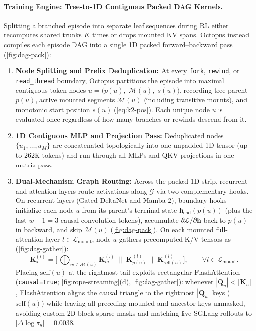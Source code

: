 \documentclass{article}
\begin{document}
\paragraph{Training Engine: Tree-to-1D Contiguous Packed DAG Kernels.}
Splitting a branched episode into separate leaf sequences during RL either recomputes shared trunks $K$ times or drops mounted KV spans. Octopus instead compiles each episode DAG into a single 1D packed forward--backward pass (\cref{fig:dag-pack}):
\begin{enumerate}[leftmargin=15pt, itemsep=1.5pt, topsep=2pt]
  \item \textbf{Node Splitting and Prefix Deduplication:} At every \texttt{fork}, \texttt{rewind}, or \texttt{read\_thread} boundary, Octopus partitions the episode into maximal contiguous token nodes $u = \big(p(u),\; \mathcal{M}(u),\; s(u)\big)$, recording tree parent $p(u)$, active mounted segments $\mathcal{M}(u)$ (including transitive mounts), and monotonic start position $s(u)$ (\cref{eq:k2-pos}). Each unique node $u$ is evaluated once regardless of how many branches or rewinds descend from it.
  \item \textbf{1D Contiguous MLP and Projection Pass:} Deduplicated nodes $\{u_1, \dots, u_M\}$ are concatenated topologically into one unpadded 1D tensor (up to $262\text{K}$ tokens) and run through all MLPs and QKV projections in one matrix pass.
  \item \textbf{Dual-Mechanism Graph Routing:} Across the packed 1D strip, recurrent and attention layers route activations along $\mathcal{G}$ via two complementary hooks. On recurrent layers (Gated DeltaNet and Mamba-2), boundary hooks initialize each node $u$ from its parent's terminal state $\mathbf{h}_{\text{end}}(p(u))$ (plus the last $w - 1 = 3$ causal-convolution tokens), accumulate $\partial \mathcal{L} / \partial \mathbf{h}$ back to $p(u)$ in backward, and skip $\mathcal{M}(u)$ (\cref{fig:dag-pack}). On each mounted full-attention layer $l \in \mathcal{L}_{\text{mount}}$, node $u$ gathers precomputed K/V tensors as (\cref{fig:dag-gather}):
  \begin{equation}
  \label{eq:dag-attn}
  \mathbf{K}_u^{(l)} = \Big[\, \bigoplus_{m \in \mathcal{M}(u)} \mathbf{K}_m^{(l)} \;\Big\|\; \mathbf{K}_{p(u)}^{(l)} \;\Big\|\; \mathbf{K}_{\text{self}(u)}^{(l)} \,\Big], \qquad \forall l \in \mathcal{L}_{\text{mount}}.
  \end{equation}
  Placing $\text{self}(u)$ at the rightmost tail exploits rectangular FlashAttention (\texttt{causal=True}; \cref{fig:rope-streaming}(d), \cref{fig:dag-gather}): whenever $|\mathbf{Q}_u| < |\mathbf{K}_u|$, FlashAttention aligns the causal triangle to the rightmost $|\mathbf{Q}_u|$ keys ($\text{self}(u)$) while leaving all preceding mounted and ancestor keys unmasked, avoiding custom 2D block-sparse masks and matching live SGLang rollouts to $|\Delta \log \pi_\theta| = 0.0038$.
\end{enumerate}
\end{document}
